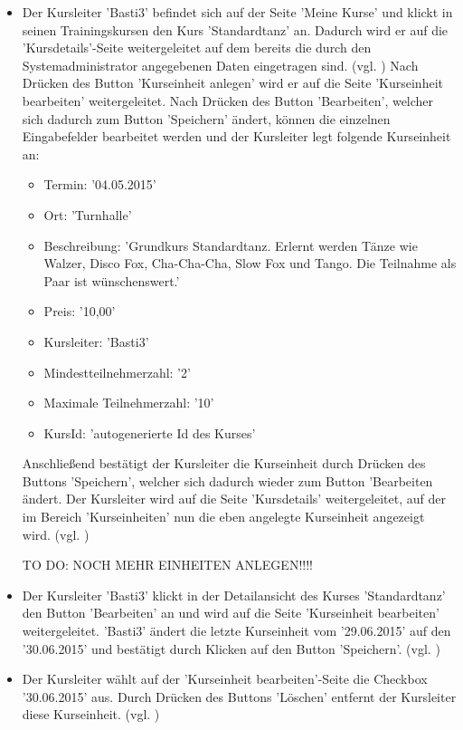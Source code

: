 \documentclass[a4paper]{scrreprt}
\begin{document}
\begin{itemize}
			\item {} 
			 Der Kursleiter 'Basti3' befindet sich auf der Seite 'Meine Kurse' und klickt in seinen Trainingskursen den Kurs 'Standardtanz' an. Dadurch wird er auf die 'Kursdetails'-Seite weitergeleitet auf dem bereits die durch den Systemadministrator angegebenen Daten eingetragen sind. (vgl. ) Nach Drücken des Button 'Kurseinheit anlegen' wird er auf die Seite 'Kurseinheit bearbeiten' weitergeleitet. Nach Drücken des Button 'Bearbeiten', welcher sich dadurch zum Button 'Speichern' ändert, können die einzelnen Eingabefelder bearbeitet werden und der Kursleiter legt folgende Kurseinheit an:
				\begin{itemize}
					\item Termin: '04.05.2015'
					\item Ort: 'Turnhalle'
					\item Beschreibung: 'Grundkurs Standardtanz. Erlernt werden Tänze wie Walzer, Disco Fox, Cha-Cha-Cha, Slow Fox und Tango. Die Teilnahme als Paar ist wünschenswert.'
					\item Preis: '10,00'
					\item Kursleiter: 'Basti3'
					\item Mindestteilnehmerzahl: '2'
					\item Maximale Teilnehmerzahl: '10'
					\item KursId: 'autogenerierte Id des Kurses'
				\end{itemize}	
			 Anschließend bestätigt der Kursleiter die Kurseinheit durch Drücken des Buttons 'Speichern', welcher sich dadurch wieder zum Button 'Bearbeiten ändert. Der Kursleiter wird auf die Seite 'Kursdetails' weitergeleitet, auf der im Bereich 'Kurseinheiten' nun die eben angelegte Kurseinheit angezeigt wird. (vgl. )
			 
			 TO DO: NOCH MEHR EINHEITEN ANLEGEN!!!!
			 
			
			\item {}
			 Der Kursleiter 'Basti3' klickt in der Detailansicht des Kurses 'Standardtanz' den Button 'Bearbeiten' an und wird auf die Seite 'Kurseinheit bearbeiten' weitergeleitet. 'Basti3' ändert die letzte Kurseinheit vom '29.06.2015' auf den '30.06.2015' und bestätigt durch Klicken auf den Button 'Speichern'. (vgl. )
			
			\item {}
			 Der Kursleiter wählt auf der 'Kurseinheit bearbeiten'-Seite die Checkbox '30.06.2015' aus. Durch Drücken des Buttons 'Löschen' entfernt der Kursleiter diese Kurseinheit. (vgl. )			
		\end{itemize}
		
\end{document}
